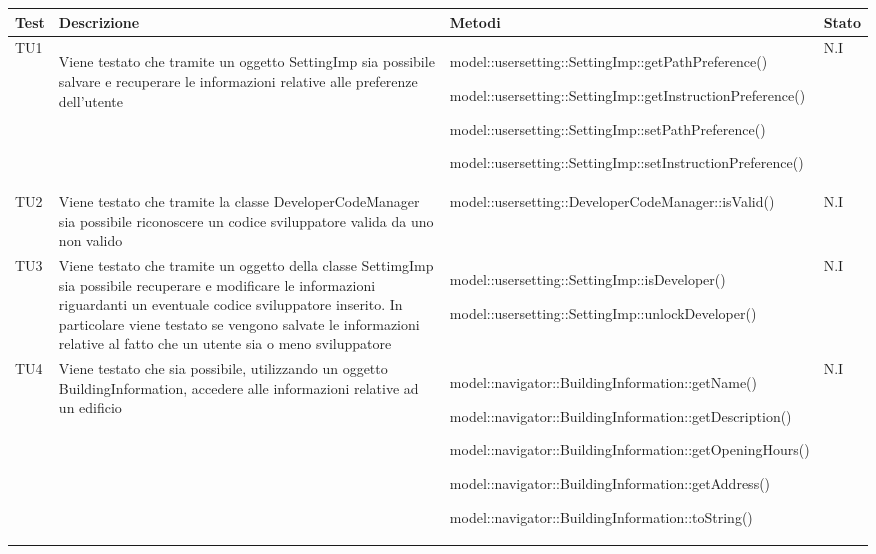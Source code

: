 \documentclass[../PianoDiQualifica.tex]{subfiles}
\begin{document}
\begin{appendices}
	\begin{longtabu} to \textwidth {X[0.6cm] X[3cm] X[4cm] X}
\toprule
\textbf{Test} & \textbf{Descrizione} & \textbf{Metodi} & \textbf{Stato}\\
\midrule
\endhead
{}
TU1 & \begin{flushleft}Viene testato che tramite un oggetto SettingImp sia possibile salvare e recuperare le informazioni relative alle preferenze dell'utente\end{flushleft} & \begin{flushleft}
model::\-usersetting::\-SettingImp::\-getPathPreference() \par model::usersetting::SettingImp::getInstructionPreference() \par model::usersetting::SettingImp::setPathPreference() \par model::usersetting::SettingImp::setInstructionPreference()
\end{flushleft}
 & N.I \\ 
\midrule 
TU2 & Viene testato che tramite la classe DeveloperCodeManager sia possibile riconoscere un codice sviluppatore valida da uno non valido & model::usersetting::DeveloperCodeManager::isValid() & N.I \\ 
\midrule 
TU3 & Viene testato che tramite un oggetto della classe SettimgImp sia possibile recuperare e modificare le informazioni riguardanti un eventuale codice sviluppatore inserito. In particolare viene testato se vengono salvate le informazioni relative al fatto che un utente sia o meno sviluppatore & model::usersetting::SettingImp::isDeveloper() \par model::usersetting::SettingImp::unlockDeveloper() & N.I \\ 
\midrule 
TU4 & Viene testato che sia possibile, utilizzando un oggetto BuildingInformation, accedere alle informazioni relative ad un edificio & model::navigator::BuildingInformation::getName() \par model::navigator::BuildingInformation::getDescription() \par model::navigator::BuildingInformation::getOpeningHours() \par model::navigator::BuildingInformation::getAddress() \par model::navigator::BuildingInformation::toString() & N.I \\ 
\midrule 

\end{longtabu}
\end{appendices}
\end{document}
